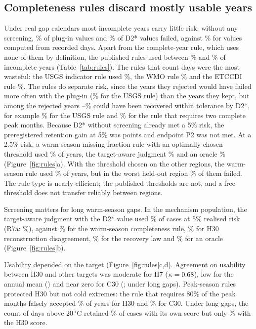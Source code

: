 \documentclass[draft]{agujournal2025}
\begin{document}
\subsection{Completeness rules discard mostly usable years}
Under real gap calendars most incomplete years carry little risk: without any screening, \TDeployFailPZero\% of plug-in values and \TDeployFailDTwo\% of D2* values failed, against \TDeployFailObs\% for values computed from recorded days. Apart from the complete-year rule, which uses none of them by definition, the published rules used between \TRetainMin\% and \TRetainMax\% of incomplete years (Table~\ref{tab:rules}). The rules that count days were the most wasteful: the USGS indicator rule used \TRetainUSGS\%, the WMO rule \TRetainWMO\% and the ETCCDI rule \TRetainETCCDI\%. The rules do separate risk, since the years they rejected would have failed more often with the plug-in (\TRejectedFailPZeroUSGS\% for the USGS rule) than the years they kept, but among the rejected years \TRejectedUsableMin--\TRejectedUsableMax\% could have been recovered within tolerance by D2*, for example \TRejectedUsableUSGS\% for the USGS rule and \TRejectedUsableBeaufort\% for the rule that requires two complete peak months. Because D2* without screening already met a 5\% risk, the preregistered retention gain at 5\% was \TPTwoGain{} points and endpoint P2 was not met. At a 2.5\% risk, a warm-season missing-fraction rule with an optimally chosen threshold used \TDeployRetWarmTwoFive\% of years, the target-aware judgment \TDeployRetTargetTwoFive\% and an oracle \TDeployRetOracleTwoFive\% (Figure~\ref{fig:rules}a). With the threshold chosen on the other regions, the warm-season rule used \TLoroFreeWarmRet\% of years, but in the worst held-out region \TLoroFreeWarmWorst\% of them failed. The rule type is nearly efficient; the published thresholds are not, and a free threshold does not transfer reliably between regions.

Screening matters for long warm-season gaps. In the mechanism population, the target-aware judgment with the D2* value used \TMechRetTarget\% of cases at 5\% realised risk (R7a: \TMechRetTargetA\%), against \TMechRetWarm\% for the warm-season completeness rule, \TMechRetTargetDisagree\% for H30 reconstruction disagreement, \TMechRetLaw\% for the recovery law and \TMechRetOracle\% for an oracle (Figure~\ref{fig:rules}b).

Usability depended on the target (Figure~\ref{fig:rules}c,d). Agreement on usability between H30 and other targets was moderate for H7 ($\kappa=0.68$), low for the annual mean (\TKappaMean) and near zero for C30 (\TKappaCThirty; \TKappaCThirtyMech{} under long gaps). Peak-season rules protected H30 but not cold extremes: the rule that requires 80\% of the peak months falsely accepted \TOregonFalseAcceptH\% of years for H30 and \TOregonFalseAcceptC\% for C30. Under long gaps, the count of days above 20\,$^{\circ}$C retained \TDaysOwnScore\% of cases with its own score but only \TDaysHScore\% with the H30 score.
\end{document}
